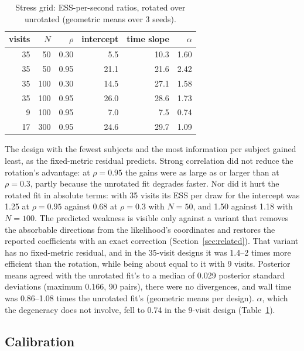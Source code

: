 \begin{table}[t]
\centering
\caption{Stress grid: ESS-per-second ratios, rotated over unrotated
(geometric means over 3 seeds).}
\label{tab:stress}
\small
\begin{tabular}{rrr rrr}
\toprule
visits & $N$ & $\rho$ & intercept & time slope & $\alpha$ \\
\midrule
35 &  50 & 0.30 &  5.5 & 10.3 & 1.60 \\
35 &  50 & 0.95 & 21.1 & 21.6 & 2.42 \\
35 & 100 & 0.30 & 14.5 & 27.1 & 1.58 \\
35 & 100 & 0.95 & 26.0 & 28.6 & 1.73 \\
 9 & 100 & 0.95 &  7.0 &  7.5 & 0.74 \\
17 & 300 & 0.95 & 24.6 & 29.7 & 1.09 \\
\bottomrule
\end{tabular}
\end{table}

The design with the fewest subjects and the most information per subject
gained least, as the fixed-metric residual predicts. Strong correlation
did not reduce the rotation's advantage: at $\rho = 0.95$ the gains were as
large as or larger than at $\rho = 0.3$, partly because the unrotated fit
degrades faster. Nor did it hurt the rotated fit in absolute terms: with
35 visits its ESS per draw for the intercept was 1.25 at $\rho = 0.95$
against 0.68 at $\rho = 0.3$ with $N = 50$, and 1.50 against 1.18 with
$N = 100$. The predicted
weakness is visible only against a variant that removes the absorbable
directions from the likelihood's coordinates and restores the reported
coefficients with an exact correction (Section~\ref{sec:related}). That
variant has no fixed-metric residual, and in the 35-visit designs it was
1.4--2 times more efficient than the rotation, while being about equal to
it with 9 visits. Posterior means agreed with the unrotated fit's to a
median of 0.029 posterior standard deviations (maximum 0.166, 90 pairs),
there were no divergences, and wall time was 0.86--1.08 times the unrotated fit's (geometric means per design). $\alpha$, which the degeneracy does not involve, fell to 0.74 in the 9-visit design (Table~\ref{tab:stress}).

\subsection{Calibration}

